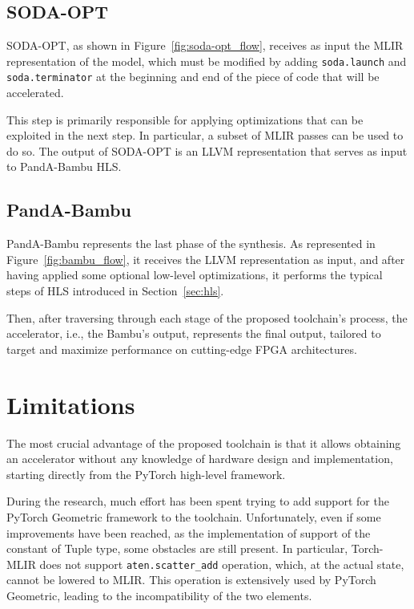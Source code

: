 \subsection{SODA-OPT}
\label{subsec:toolchain-soda_opt}%

SODA-OPT, as shown in Figure~\ref{fig:soda-opt_flow}, receives as input the MLIR representation of the model, which must be modified by adding \texttt{soda.launch} and \texttt{soda.terminator} at the beginning and end of the piece of code that will be accelerated.

This step is primarily responsible for applying optimizations that can be exploited in the next step.
In particular, a subset of MLIR passes can be used to do so.
The output of SODA-OPT is an LLVM representation that serves as input to PandA-Bambu HLS\@.

\subsection{PandA-Bambu}
\label{subsec:toolchain-panda_bambu}%

PandA-Bambu represents the last phase of the synthesis.
As represented in Figure~\ref{fig:bambu_flow}, it receives the LLVM representation as input, and after having applied some optional low-level optimizations, it performs the typical steps of HLS introduced in Section~\ref{sec:hls}.

Then, after traversing through each stage of the proposed toolchain's process, the accelerator, i.e., the Bambu's output, represents the final output, tailored to target and maximize performance on cutting-edge FPGA architectures.

\section{Limitations}
\label{sec:toolchain-limitations}%

The most crucial advantage of the proposed toolchain is that it allows obtaining an accelerator without any knowledge of hardware design and implementation, starting directly from the PyTorch high-level framework.

During the research, much effort has been spent trying to add support for the PyTorch Geometric framework to the toolchain.
Unfortunately, even if some improvements have been reached, as the implementation of support of the constant of Tuple type, some obstacles are still present.
In particular, Torch-MLIR does not support \texttt{aten.scatter\_add} operation, which, at the actual state, cannot be lowered to MLIR\@.
This operation is extensively used by PyTorch Geometric, leading to the incompatibility of the two elements.

